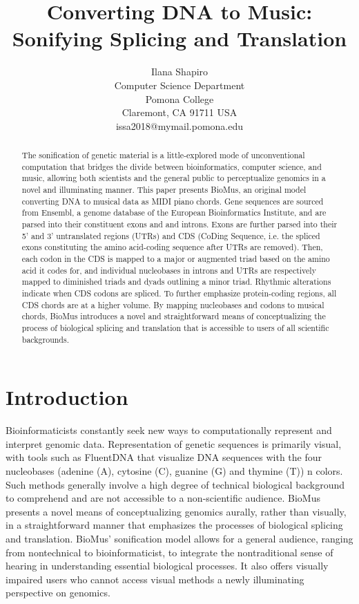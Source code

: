 \documentclass[letterpaper]{article}
\title{Converting DNA to Music: Sonifying Splicing and Translation}
\author{Ilana Shapiro\\
Computer Science Department\\
Pomona College\\
Claremont, CA 91711 USA\\
issa2018@mymail.pomona.edu\\
}
\begin{document}
 
\maketitle
\begin{abstract}
The sonification of genetic material is a little-explored mode of unconventional computation that bridges the divide between bioinformatics, computer science, and music, allowing both scientists and the general public to perceptualize genomics in a novel and illuminating manner. This paper presents BioMus, an original model converting DNA to musical data as MIDI piano chords. Gene sequences are sourced from Ensembl, a genome database of the European Bioinformatics Institute, and are parsed into their constituent exons and and introns. Exons are further parsed into their 5' and 3' untranslated regions (UTRs) and CDS (CoDing Sequence, i.e. the spliced exons constituting the amino acid-coding sequence after UTRs are removed). Then, each codon in the CDS is mapped to a major or augmented triad based on the amino acid it codes for, and individual nucleobases in introns and UTRs are respectively mapped to diminished triads and dyads outlining a minor triad. Rhythmic alterations indicate when CDS codons are spliced. To further emphasize protein-coding regions, all CDS chords are at a higher volume. By mapping nucleobases and codons to musical chords, BioMus introduces a novel and straightforward means of conceptualizing the process of biological splicing and translation that is accessible to users of all scientific backgrounds.
\end{abstract}

\section{Introduction}
Bioinformaticists constantly seek new ways to computationally represent and interpret genomic data. Representation of genetic sequences is primarily visual, with tools such as FluentDNA that visualize DNA sequences with the four nucleobases (adenine (A), cytosine (C), guanine (G) and thymine (T)) n colors.
Such methods generally involve a high degree of technical biological background to comprehend and are not accessible to a non-scientific audience. BioMus presents a novel means of conceptualizing genomics aurally, rather than visually, in a straightforward manner that emphasizes the processes of biological splicing and translation. BioMus' sonification model allows for a general audience, ranging from nontechnical to bioinformaticist, to integrate the nontraditional sense of hearing in understanding essential biological processes. It also offers visually impaired users who cannot access visual methods a newly illuminating perspective on genomics.
\end{document}
